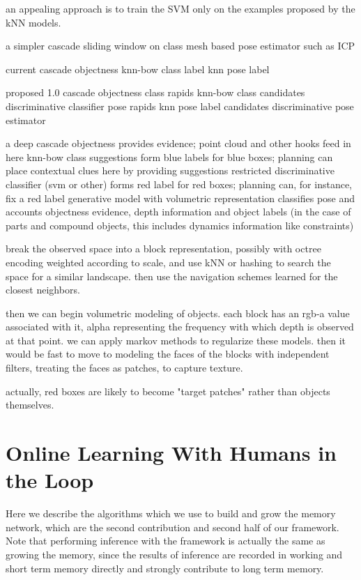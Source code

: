 \documentclass[conference]{IEEEtran}
\begin{document}
an appealing approach is to train the SVM only on the examples proposed by the kNN models.

a simpler cascade
sliding window on class
mesh based pose estimator such as ICP

current cascade
objectness
knn-bow class label
knn pose label


proposed 1.0 cascade
objectness
class rapids
knn-bow class candidates
discriminative classifier
pose rapids
knn pose label candidates
discriminative pose estimator

a deep cascade
objectness provides evidence; point cloud and other hooks feed in here
knn-bow class suggestions form blue labels for blue boxes; planning can 
place contextual clues here by providing suggestions
restricted discriminative classifier (svm or other) forms red label for 
red boxes; planning can, for instance, fix a red label 
generative model with volumetric representation classifies pose and accounts 
objectness evidence, depth information and object labels (in the case of parts 
and compound objects, this includes dynamics information like constraints)

break the observed space into a block representation, possibly with octree encoding weighted 
according to scale, and use kNN or hashing to search the space for a similar landscape. then 
use the navigation schemes learned for the closest neighbors. 

then we can begin volumetric modeling of objects. each block has an rgb-a value associated 
with it, alpha representing the frequency with which depth is observed at that point.
we can apply markov methods to regularize these models. then it would be fast to move to 
modeling the faces of the blocks with independent filters, treating the faces as patches, to capture texture.

actually, red boxes are likely to become "target patches" rather than objects themselves.
    


\section{Online Learning With Humans in the Loop}
Here we describe the algorithms which we use to build and grow the memory network,
which are the second contribution and second half of our framework.
Note that performing inference with the framework is actually the same as growing the
memory, since the results of inference are recorded in working and short term memory
directly and strongly contribute to long term memory.
\end{document}
